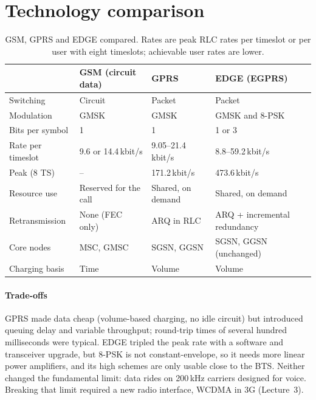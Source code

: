 \documentclass[11pt,a4paper]{article}
\begin{document}
\section{Technology comparison}\label{sec:comparison}
\begin{table}[htbp]
\centering\small
\caption{GSM, GPRS and EDGE compared. Rates are peak RLC rates per timeslot or per
user with eight timeslots; achievable user rates are lower.}\label{tab:compare}
\begin{tabularx}{\linewidth}{@{}l Y Y Y@{}}
\toprule
{} & GSM (circuit data) & GPRS & EDGE (EGPRS) \\
\midrule
Switching          & Circuit                 & Packet                     & Packet \\
Modulation         & GMSK                    & GMSK                       & GMSK and 8-PSK \\
Bits per symbol    & 1                       & 1                          & 1 or 3 \\
Rate per timeslot  & 9.6 or 14.4\,kbit/s     & 9.05--21.4\,kbit/s         & 8.8--59.2\,kbit/s \\
Peak (8 TS)        & --                      & 171.2\,kbit/s              & 473.6\,kbit/s \\
Resource use       & Reserved for the call   & Shared, on demand          & Shared, on demand \\
Retransmission     & None (FEC only)         & ARQ in RLC                 & ARQ + incremental redundancy \\
Core nodes         & MSC, GMSC               & SGSN, GGSN                 & SGSN, GGSN (unchanged) \\
Charging basis     & Time                    & Volume                     & Volume \\
\bottomrule
\end{tabularx}
\end{table}

\paragraph{Trade-offs} GPRS made data cheap (volume-based charging, no idle circuit)
but introduced queuing delay and variable throughput; round-trip times of several
hundred milliseconds were typical. EDGE tripled the peak rate with a software and
transceiver upgrade, but 8-PSK is not constant-envelope, so it needs more linear power
amplifiers, and its high schemes are only usable close to the BTS. Neither changed
the fundamental limit: data rides on 200\,kHz carriers designed for voice. Breaking
that limit required a new radio interface, WCDMA in 3G (Lecture~3).
\end{document}
